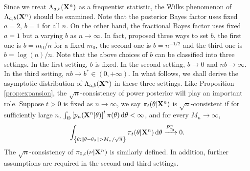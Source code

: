 \documentclass[11pt]{article}
\theoremstyle{plain}
\theoremstyle{definition}
\theoremstyle{remark}
\begin{document}
    Since we treat $\Lambda_{a,b}(\mathbf{X}^n)$ as a frequentist statistic,
    the Wilks phenomenon of $\Lambda_{a,b}(\mathbf{X}^n)$ should be examined.
    Note that the posterior Bayes factor uses fixed $a=2$, $b=1$ for all $n$.
    On the other hand, the fractional Bayes factor uses fixed $a=1$ but a varying $b$ as $n \to \infty$.
    In fact, \cite{Fractional1995} proposed three ways to set $b$, the first one is $b=m_0/n$ for a fixed $m_0$, the second one is $b=n^{-1/2}$ and the third one is $b=\log ( n) /n$.
    Note that the above choices of $b$ can be classified into three settings.
    In the first setting, $b$ is fixed.
    In the second setting, $b \to 0$ and $n b \to \infty$.
    In the third setting, $n b \to b^* \in (0, +\infty) $.
    In what follows, we shall derive the asymptotic distribution of $\Lambda_{a,b}(\mathbf{X}^n)$ in these three settings.
Like Proposition \ref{prop:expansion}, the $\sqrt{n}$-consistency of power posterior will play an important role.
Suppose $t>0$ is fixed as $n \to \infty$, 
we say $\pi_t(\theta | \mathbf{X}^n)$ is $\sqrt n$-consistent if for sufficiently large $n$, $\int_{\Theta} \left[ p_n (\mathbf{X}^n | \theta) \right]^t \pi (\theta) \, \mathrm d \theta < \infty$, and for every $M_n \to \infty$,
\begin{align*}
\int_{ \left\{ \theta: \|\theta - \theta_0\| > M_n / \sqrt n \right\}}\pi_t(\theta | \mathbf{X}^n) \, \mathrm d \theta \xrightarrow{P_{\theta_0}^n} 0.
\end{align*}
The $\sqrt n$-consistency of $\pi_{0,t}(\nu | \mathbf{X}^n)$ is similarly defined.
In addition, further assumptions are required in the second and third settings.
\end{document}
